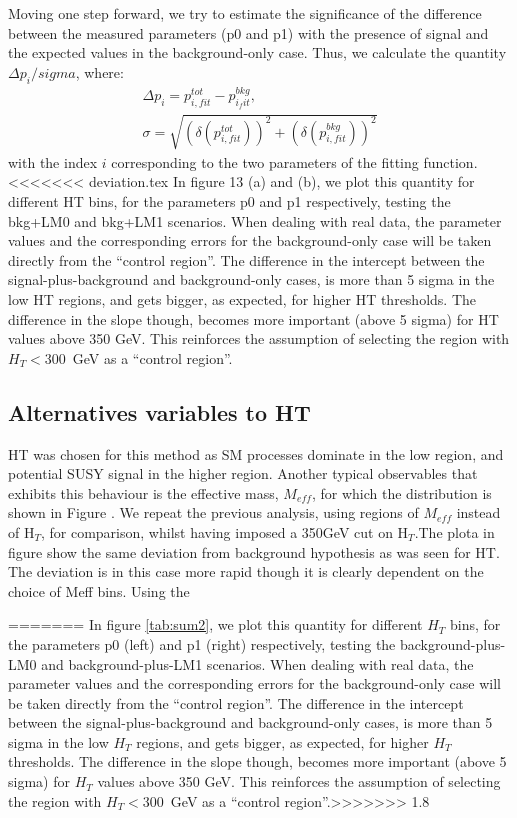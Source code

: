 Moving one step forward, we try to estimate the significance of the difference between the measured parameters (p0 and p1) with the presence of signal and the expected values in the background-only case. Thus, we calculate the quantity $\Delta p_{i} / sigma$, where:
\begin{eqnarray}
\Delta p_{i} = p_{i, fit}^{tot} - p_{i_fit}^{bkg},  \\
\sigma =  \sqrt{ (\delta (p_{i, fit}^{tot}))^{2} + (\delta (p_{i, fit}^{bkg}))^{2} } 
\end{eqnarray}
with the index $i$ corresponding to the two parameters of the fitting function.
<<<<<<< deviation.tex
In figure 13 (a) and (b), we plot this quantity for different HT bins, for the parameters p0 and p1 respectively, testing the bkg+LM0 and bkg+LM1 scenarios. When dealing with real data, the parameter values and the corresponding errors for the background-only case will be taken directly from the ``control region''. The difference in the intercept between the signal-plus-background and background-only cases, is more than 5 sigma in the low HT regions, and gets bigger, as expected, for higher HT thresholds. The difference in the slope though, becomes more important (above 5 sigma) for HT values above 350 GeV. This reinforces the assumption of selecting the region with $H_{T}<300$~GeV as a ``control region''.

\subsection{Alternatives variables to HT}
HT was chosen for this method as SM processes dominate in the low region, and potential SUSY signal in the higher region. Another typical observables that exhibits this behaviour is the effective mass, $M_{eff}$, for which the distribution is shown in Figure . We repeat the previous analysis, using regions of $M_{eff}$ instead of H$_{T}$, for comparison, whilst having imposed a 350GeV cut on H$_{T}$.The plota in figure show the same deviation from background hypothesis as was seen for HT. The deviation is in this case more rapid though it is clearly dependent on the choice of Meff bins. Using the 


=======
In figure \ref{tab:sum2}, we plot this quantity for different $H_{T}$ bins, for the parameters p0 (left) and p1 (right) respectively, testing the background-plus-LM0 and background-plus-LM1 scenarios. When dealing with real data, the parameter values and the corresponding errors for the background-only case will be taken directly from the ``control region''. The difference in the intercept between the signal-plus-background and background-only cases, is more than 5 sigma in the low $H_{T}$ regions, and gets bigger, as expected, for higher $H_{T}$ thresholds. The difference in the slope though, becomes more important (above 5 sigma) for $H_{T}$ values above 350 GeV. This reinforces the assumption of selecting the region with $H_{T}<300$~GeV as a ``control region''.>>>>>>> 1.8
